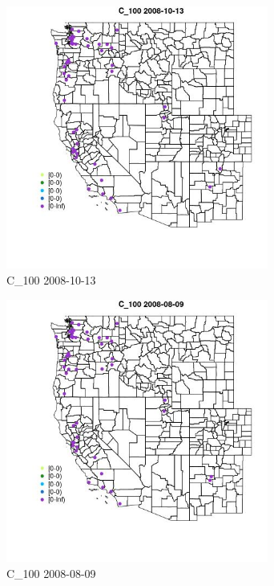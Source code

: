 \begin{figure} 
\centering  
\includegraphics[width=0.77\textwidth]{Code_Outputs/Report_ML_input_PM25_Step4_part_e_de_duplicated_aves_MapObsC_1002008-10-13.jpg} 
\caption{\label{fig:Report_ML_input_PM25_Step4_part_e_de_duplicated_avesMapObsC_1002008-10-13}C_100 2008-10-13} 
\end{figure} 
 

\begin{figure} 
\centering  
\includegraphics[width=0.77\textwidth]{Code_Outputs/Report_ML_input_PM25_Step4_part_e_de_duplicated_aves_MapObsC_1002008-08-09.jpg} 
\caption{\label{fig:Report_ML_input_PM25_Step4_part_e_de_duplicated_avesMapObsC_1002008-08-09}C_100 2008-08-09} 
\end{figure} 
 

